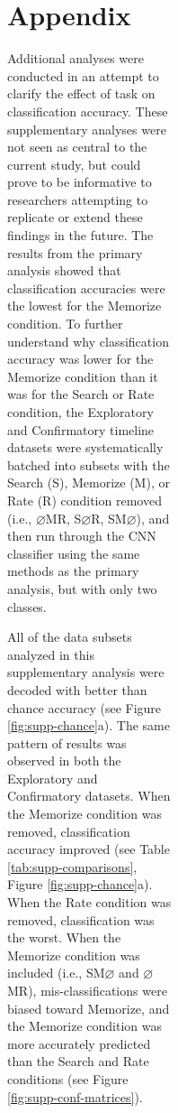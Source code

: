 \documentclass[
  english,
  man, donotrepeattitle,floatsintext]{apa6}
\begin{document}
\begin{figure}
\begin{figure}
\begin{figure}
\begin{figure}
\endgroup

\newpage

\section{Appendix}

Additional analyses were conducted in an attempt to clarify the effect of task on classification accuracy. These supplementary analyses were not seen as central to the current study, but could prove to be informative to researchers attempting to replicate or extend these findings in the future. The results from the primary analysis showed that classification accuracies were the lowest for the Memorize condition. To further understand why classification accuracy was lower for the Memorize condition than it was for the Search or Rate condition, the Exploratory and Confirmatory timeline datasets were systematically batched into subsets with the Search (S), Memorize (M), or Rate (R) condition removed (i.e., \(\varnothing\)MR, S\(\varnothing\)R, SM\(\varnothing\)), and then run through the CNN classifier using the same methods as the primary analysis, but with only two classes.

All of the data subsets analyzed in this supplementary analysis were decoded with better than chance accuracy (see Figure \ref{fig:supp-chance}a). The same pattern of results was observed in both the Exploratory and Confirmatory datasets. When the Memorize condition was removed, classification accuracy improved (see Table \ref{tab:supp-comparisons}, Figure \ref{fig:supp-chance}a). When the Rate condition was removed, classification was the worst. When the Memorize condition was included (i.e., SM\(\varnothing\) and \(\varnothing\)MR), mis-classifications were biased toward Memorize, and the Memorize condition was more accurately predicted than the Search and Rate conditions (see Figure \ref{fig:supp-conf-matrices}).


\end{figure}
\end{figure}
\end{figure}
\end{figure}
\end{document}

